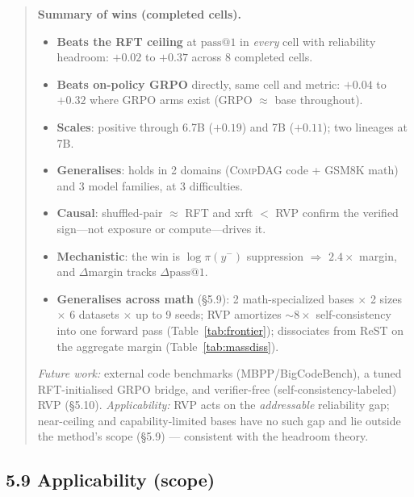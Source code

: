 \begin{quote}
\colorbox{winbg}{\parbox{0.93\textwidth}{
\small\textbf{Summary of wins (completed cells).}
\begin{itemize}\itemsep1pt
\item \textbf{Beats the RFT ceiling} at $\text{pass}@1$ in \emph{every} cell with
reliability headroom: $+0.02$ to $+0.37$ across 8 completed cells.
\item \textbf{Beats on-policy GRPO} directly, same cell and metric: $+0.04$ to
$+0.32$ where GRPO arms exist (GRPO $\approx$ base throughout).
\item \textbf{Scales}: positive through 6.7B ($+0.19$) and 7B ($+0.11$); two
lineages at 7B.
\item \textbf{Generalises}: holds in 2 domains (\textsc{CompDAG} code + GSM8K math) and 3
model families, at 3 difficulties.
\item \textbf{Causal}: shuffled-pair $\approx$ RFT and xrft $<$ RVP confirm the
verified sign---not exposure or compute---drives it.
\item \textbf{Mechanistic}: the win is $\log\pi(y^{-})$ suppression $\Rightarrow$
$2.4\times$ margin, and $\Delta$margin tracks $\Delta\text{pass}@1$.
\item \textbf{Generalises across math} (\S5.9): 2 math-specialized bases $\times$ 2 sizes $\times$ 6
datasets $\times$ up to 9 seeds; RVP amortizes $\sim\!8\times$ self-consistency into one forward pass
(Table~\ref{tab:frontier}); dissociates from ReST on the aggregate margin (Table~\ref{tab:massdiss}).
\end{itemize}
\emph{Future work:} external code benchmarks (MBPP/BigCodeBench), a tuned RFT-initialised GRPO bridge,
and verifier-free (self-consistency-labeled) RVP (\S5.10). \emph{Applicability:} RVP acts on the
\emph{addressable} reliability gap; near-ceiling and capability-limited bases have no such gap and
lie outside the method's scope (\S5.9) --- consistent with the headroom theory.
}}
\end{quote}

\subsection*{5.9 Applicability (scope)}

